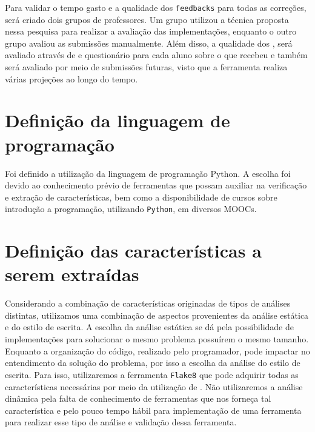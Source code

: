 	 	Para validar o tempo gasto e a qualidade dos \texttt{feedbacks} para todas as correções,
	 	será criado dois grupos de professores. Um grupo utilizou a técnica proposta nessa pesquisa para
	 	realizar a avaliação das implementações, enquanto o outro grupo avaliou as submissões
	 	manualmente. Além disso, a qualidade dos , será avaliado através de 
	 	e questionário para cada aluno sobre o  que recebeu e também será avaliado
	 	por meio de submissões futuras, visto que a ferramenta realiza várias projeções ao longo do tempo.

	\section{Definição da linguagem de programação}
		Foi definido a utilização da linguagem de programação Python. A escolha foi
		devido ao conhecimento prévio de ferramentas que possam auxiliar na verificação
		e extração de características, bem como a disponibilidade de cursos sobre
		introdução a programação, utilizando \texttt{Python}, em diversos \acs{MOOC}s.

	\section{Definição das características a serem extraídas}
		Considerando a combinação de características originadas de tipos de análises
		distintas, utilizamos uma combinação de aspectos provenientes da análise  %
		estática e do estilo de escrita. A escolha da análise estática se dá pela
		possibilidade de implementações para solucionar o mesmo problema possuírem
		o mesmo tamanho. Enquanto a organização do código, realizado pelo programador,
		pode impactar no entendimento da solução do problema, por isso a escolha da
		análise do estilo de escrita. Para isso, utilizaremos a ferramenta \texttt{Flake8}
		\cite{flake8} que pode adquirir todas as características necessárias por meio da
		utilização de . Não utilizaremos a análise dinâmica pela falta
		de conhecimento de ferramentas que nos forneça tal característica e pelo pouco
		tempo hábil para implementação de uma ferramenta para realizar esse tipo de
		análise e validação dessa ferramenta.
		
